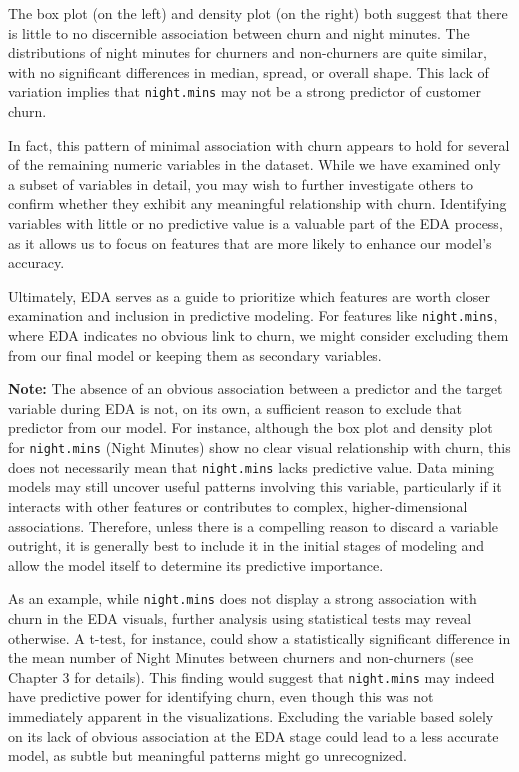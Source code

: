 \documentclass[
]{book}
\newcommand{\passthrough}[1]{#1}
\theoremstyle{definition}
\theoremstyle{definition}
\theoremstyle{definition}
\theoremstyle{definition}
\theoremstyle{remark}
\begin{document}
The box plot (on the left) and density plot (on the right) both suggest that there is little to no discernible association between churn and night minutes. The distributions of night minutes for churners and non-churners are quite similar, with no significant differences in median, spread, or overall shape. This lack of variation implies that \passthrough{\lstinline!night.mins!} may not be a strong predictor of customer churn.

In fact, this pattern of minimal association with churn appears to hold for several of the remaining numeric variables in the dataset. While we have examined only a subset of variables in detail, you may wish to further investigate others to confirm whether they exhibit any meaningful relationship with churn. Identifying variables with little or no predictive value is a valuable part of the EDA process, as it allows us to focus on features that are more likely to enhance our model's accuracy.

Ultimately, EDA serves as a guide to prioritize which features are worth closer examination and inclusion in predictive modeling. For features like \passthrough{\lstinline!night.mins!}, where EDA indicates no obvious link to churn, we might consider excluding them from our final model or keeping them as secondary variables.

\textbf{Note:} The absence of an obvious association between a predictor and the target variable during EDA is not, on its own, a sufficient reason to exclude that predictor from our model. For instance, although the box plot and density plot for \passthrough{\lstinline!night.mins!} (Night Minutes) show no clear visual relationship with churn, this does not necessarily mean that \passthrough{\lstinline!night.mins!} lacks predictive value. Data mining models may still uncover useful patterns involving this variable, particularly if it interacts with other features or contributes to complex, higher-dimensional associations. Therefore, unless there is a compelling reason to discard a variable outright, it is generally best to include it in the initial stages of modeling and allow the model itself to determine its predictive importance.

As an example, while \passthrough{\lstinline!night.mins!} does not display a strong association with churn in the EDA visuals, further analysis using statistical tests may reveal otherwise. A t-test, for instance, could show a statistically significant difference in the mean number of Night Minutes between churners and non-churners (see Chapter 3 for details). This finding would suggest that \passthrough{\lstinline!night.mins!} may indeed have predictive power for identifying churn, even though this was not immediately apparent in the visualizations. Excluding the variable based solely on its lack of obvious association at the EDA stage could lead to a less accurate model, as subtle but meaningful patterns might go unrecognized.
\end{document}
